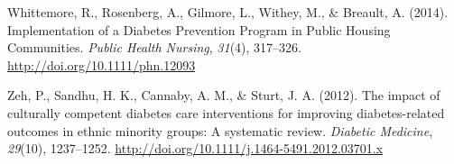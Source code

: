 \documentclass [11pt, proquest] {uwthesis}[2015/03/03]
\begin{document}
\hypertarget{ref-Whittemore2014}{}
Whittemore, R., Rosenberg, A., Gilmore, L., Withey, M., \& Breault, A.
(2014). Implementation of a Diabetes Prevention Program in Public
Housing Communities. \emph{Public Health Nursing}, \emph{31}(4),
317--326. \url{http://doi.org/10.1111/phn.12093}

\hypertarget{ref-Zeh2012}{}
Zeh, P., Sandhu, H. K., Cannaby, A. M., \& Sturt, J. A. (2012). The
impact of culturally competent diabetes care interventions for improving
diabetes-related outcomes in ethnic minority groups: A systematic
review. \emph{Diabetic Medicine}, \emph{29}(10), 1237--1252.
\url{http://doi.org/10.1111/j.1464-5491.2012.03701.x}
\end{document}

